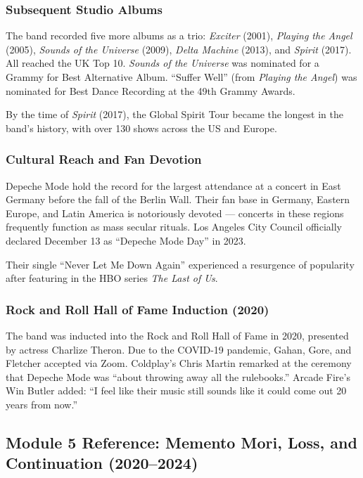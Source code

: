 \documentclass[11pt,letterpaper]{article}
\begin{document}
\subsubsection{Subsequent Studio Albums}

The band recorded five more albums as a trio: \textit{Exciter} (2001), \textit{Playing the Angel} (2005), \textit{Sounds of the Universe} (2009), \textit{Delta Machine} (2013), and \textit{Spirit} (2017). All reached the UK Top 10. \textit{Sounds of the Universe} was nominated for a Grammy for Best Alternative Album. ``Suffer Well'' (from \textit{Playing the Angel}) was nominated for Best Dance Recording at the 49th Grammy Awards.

By the time of \textit{Spirit} (2017), the Global Spirit Tour became the longest in the band's history, with over 130 shows across the US and Europe.

\subsubsection{Cultural Reach and Fan Devotion}

Depeche Mode hold the record for the largest attendance at a concert in East Germany before the fall of the Berlin Wall. Their fan base in Germany, Eastern Europe, and Latin America is notoriously devoted --- concerts in these regions frequently function as mass secular rituals. Los Angeles City Council officially declared December 13 as ``Depeche Mode Day'' in 2023.

Their single ``Never Let Me Down Again'' experienced a resurgence of popularity after featuring in the HBO series \textit{The Last of Us}.

\subsubsection{Rock and Roll Hall of Fame Induction (2020)}

The band was inducted into the Rock and Roll Hall of Fame in 2020, presented by actress Charlize Theron. Due to the COVID-19 pandemic, Gahan, Gore, and Fletcher accepted via Zoom. Coldplay's Chris Martin remarked at the ceremony that Depeche Mode was ``about throwing away all the rulebooks.'' Arcade Fire's Win Butler added: ``I feel like their music still sounds like it could come out 20 years from now.''

\subsection{Module 5 Reference: Memento Mori, Loss, and Continuation (2020--2024)}
\end{document}
